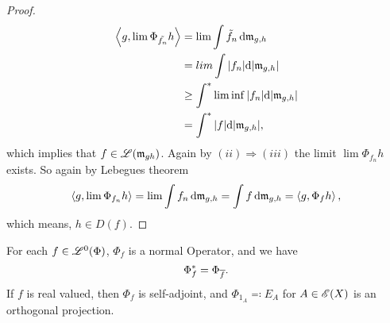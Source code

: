 \begin{proof}
 \begin{align*}
   \left\langle g, \lim \Phi_{\tilde{f_n}} h \right\rangle &= \lim \int \tilde{f}_n \operatorname{d}\! \mathfrak{m}_{g,h} \\
   &= lim \int |f_n| \text{d}  |\mathfrak{m}_{g,h}| \\
   &\geq \int ^{*} \liminf |f_n| \text{d}  |\mathfrak{m}_{g,h}| \\
   &= \int ^{*} |f| \text{d}  |\mathfrak{m}_{g,h}|,
 \end{align*}
 which implies that $f \in \mathscr{L}(\mathfrak{m}_{gh})$. 
 Again by $(ii) \Rightarrow (iii)$ the limit $\lim \Phi_{f_n} h $ exists.
 So again by Lebegues theorem
 \[
 \left\langle g, \lim \Phi_{f_n} h  \right\rangle = \lim \int f_n \operatorname{d}\! \mathfrak{m}_{g,h} = \int f \operatorname{d}\! \mathfrak{m}_{g,h}
 =\left\langle g, \Phi_f h \right\rangle,
 \]
which means, $h \in D(f)$. 


\end{proof}




\begin{lem}
  \label{maintheorem3}
 For each $f \in \mathscr{L}^0(\Phi)$, $\Phi_f$ is a normal Operator, and we have
\[
\Phi_f ^{*} = \Phi_{\overline{f}}. 
\]
If $f$ is real valued, then $\Phi_f$ is self-adjoint, and $\Phi_{1_A} \eqqcolon E_A$ for $ A \in \mathscr{E}(X)$ is an orthogonal projection. 
\end{lem}


